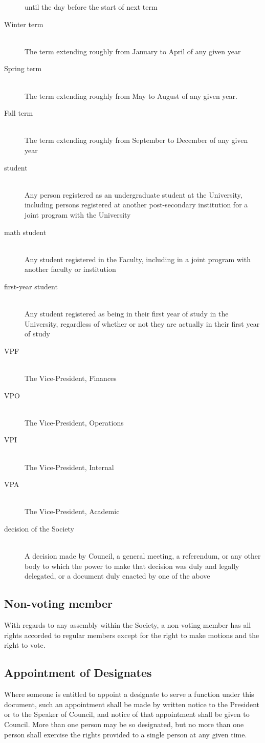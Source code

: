 \begin{description}
  until the day before the start of next term
\item[Winter term]\hfill\\
  The term extending roughly from January to April of any given year
\item[Spring term]\hfill\\
  The term extending roughly from May to August of any given year.
\item[Fall term]\hfill\\
  The term extending roughly from September to December of any given year
\item[student]\hfill\\
  Any person registered as an undergraduate student at the University, including
  persons registered at another post-secondary institution for a joint program
  with the University
\item[math student]\hfill\\
  Any student registered in the Faculty, including in a joint program with
  another faculty or institution
\item[first-year student]\hfill\\
  Any student registered as being in their first year of study in the
  University, regardless of whether or not they are actually in their first year
  of study
\item[VPF]\hfill\\
  The Vice-President, Finances
\item[VPO]\hfill\\
  The Vice-President, Operations
\item[VPI]\hfill\\
  The Vice-President, Internal
\item[VPA]\hfill\\
  The Vice-President, Academic
\item[decision of the Society]\hfill\\
  A decision made by Council, a general meeting, a referendum, or any other body
  to which the power to make that decision was duly and legally delegated, or a
  document duly enacted by one of the above
\end{description}

\subsection{Non-voting member}
With regards to any assembly within the Society, a non-voting member has all
rights accorded to regular members except for the right to make motions and
the right to vote.

\subsection{Appointment of Designates}

Where someone is entitled to appoint a designate to serve a function
under this document, such an appointment shall be made by written notice to
the President or to the Speaker of Council, and notice of that appointment
shall be given to Council. More than one person may be so designated, but no
more than one person shall exercise the rights provided to a single person at
any given time.
